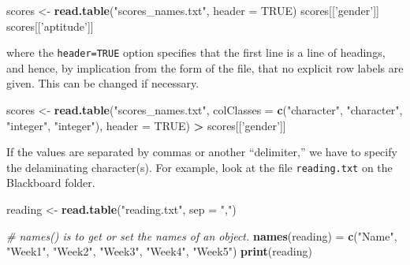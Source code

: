\documentclass[]{book}
\newenvironment{Shaded}{\begin{snugshade}}{\end{snugshade}}
\newcommand{\KeywordTok}[1]{\textcolor[rgb]{0.13,0.29,0.53}{\textbf{#1}}}
\newcommand{\DataTypeTok}[1]{\textcolor[rgb]{0.13,0.29,0.53}{#1}}
\newcommand{\StringTok}[1]{\textcolor[rgb]{0.31,0.60,0.02}{#1}}
\newcommand{\CommentTok}[1]{\textcolor[rgb]{0.56,0.35,0.01}{\textit{#1}}}
\newcommand{\OtherTok}[1]{\textcolor[rgb]{0.56,0.35,0.01}{#1}}
\newcommand{\OperatorTok}[1]{\textcolor[rgb]{0.81,0.36,0.00}{\textbf{#1}}}
\newcommand{\NormalTok}[1]{#1}
\begin{document}
\begin{Shaded}
\begin{Highlighting}[]
\NormalTok{scores <-}\StringTok{ }\KeywordTok{read.table}\NormalTok{(}\StringTok{"scores_names.txt"}\NormalTok{, }\DataTypeTok{header =} \OtherTok{TRUE}\NormalTok{) }
\NormalTok{scores[[}\StringTok{'gender'}\NormalTok{]]}
\NormalTok{scores[[}\StringTok{'aptitude'}\NormalTok{]]}
\end{Highlighting}
\end{Shaded}

where the \texttt{header=TRUE} option specifies that the first line is a
line of headings, and hence, by implication from the form of the file,
that no explicit row labels are given. This can be changed if necessary.

\begin{Shaded}
\begin{Highlighting}[]
\NormalTok{scores <-}\StringTok{ }\KeywordTok{read.table}\NormalTok{(}\StringTok{"scores_names.txt"}\NormalTok{, }
                     \DataTypeTok{colClasses =} \KeywordTok{c}\NormalTok{(}\StringTok{"character"}\NormalTok{, }\StringTok{"character"}\NormalTok{, }
                                    \StringTok{"integer"}\NormalTok{, }\StringTok{"integer"}\NormalTok{), }
                     \DataTypeTok{header =} \OtherTok{TRUE}\NormalTok{)}
\OperatorTok{>}\StringTok{ }\NormalTok{scores[[}\StringTok{'gender'}\NormalTok{]]}
\end{Highlighting}
\end{Shaded}

If the values are separated by commas or another ``delimiter,'' we have
to specify the delaminating character(s). For example, look at the file
\texttt{reading.txt} on the Blackboard folder.

\begin{Shaded}
\begin{Highlighting}[]
\NormalTok{reading <-}\StringTok{ }\KeywordTok{read.table}\NormalTok{(}\StringTok{"reading.txt"}\NormalTok{, }\DataTypeTok{sep =} \StringTok{","}\NormalTok{)}

\CommentTok{# names() is to get or set the names of an object.}
\KeywordTok{names}\NormalTok{(reading) =}\StringTok{ }\KeywordTok{c}\NormalTok{(}\StringTok{"Name"}\NormalTok{, }\StringTok{"Week1"}\NormalTok{, }\StringTok{"Week2"}\NormalTok{, }\StringTok{"Week3"}\NormalTok{, }
                   \StringTok{"Week4"}\NormalTok{, }\StringTok{"Week5"}\NormalTok{) }
\KeywordTok{print}\NormalTok{(reading)}
\end{Highlighting}
\end{Shaded}
\end{document}

